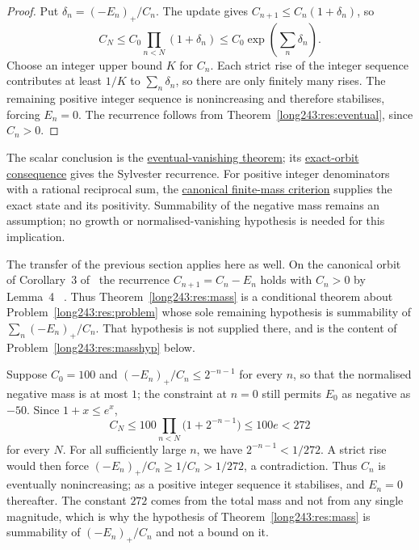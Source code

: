 \begin{proof}
Put \(\delta_n=(-E_n)_+/C_n\). The update gives
\(C_{n+1}\le C_n(1+\delta_n)\), so
\[
 C_N\le C_0\prod_{n<N}(1+\delta_n)
 \le C_0\exp\!\left(\sum_n\delta_n\right).
\]
Choose an integer upper bound \(K\) for \(C_n\). Each strict rise of the
integer sequence contributes at least \(1/K\) to \(\sum_n\delta_n\), so
there are only finitely many rises. The remaining positive integer sequence
is nonincreasing and therefore stabilises, forcing \(E_n=0\). The recurrence
follows from Theorem~\ref{long243:res:eventual}, since \(C_n>0\).
\end{proof}

\noindent The scalar conclusion is the
\href{https://github.com/wcook04/plectis-erdos/blob/d058b9150218ae23d2cfd975580088d6167e9da8/ErdosProblems/Erdos243/SparseResetRecovery.lean#L612}{eventual-vanishing theorem};
its \href{https://github.com/wcook04/plectis-erdos/blob/d058b9150218ae23d2cfd975580088d6167e9da8/ErdosProblems/Erdos243/SparseResetRecovery.lean#L690}{exact-orbit consequence}
gives the Sylvester recurrence. For positive integer denominators with a
rational reciprocal sum, the
\href{https://github.com/wcook04/plectis-erdos/blob/d058b9150218ae23d2cfd975580088d6167e9da8/ErdosProblems/Erdos243/PaperCompleteR8/CanonicalNegativeMass.lean#L19}{canonical finite-mass criterion}
supplies the exact state and its positivity. Summability of the negative mass
remains an assumption; no growth or normalised-vanishing hypothesis is needed
for this implication.

The transfer of the previous section applies here as well.  On the canonical
orbit of Corollary~3 of~\cite[p.~9]{koizumi2025} the recurrence
$C_{n+1}=C_n-E_n$ holds with $C_n>0$ by Lemma~4
~\cite[pp.~11--12]{koizumi2025}. Thus Theorem~\ref{long243:res:mass} is a conditional theorem about
Problem~\ref{long243:res:problem} whose sole remaining hypothesis is summability of
$\sum_n(-E_n)_+/C_n$.  That hypothesis is not supplied there, and is the
content of Problem~\ref{long243:res:masshyp} below.

\begin{example}\label{long243:ex:mass}
Suppose $C_0=100$ and $(-E_n)_+/C_n\le2^{-n-1}$ for every $n$, so that the
normalised negative mass is at most $1$; the constraint at $n=0$ still permits
$E_0$ as negative as $-50$.  Since $1+x\le e^{x}$,
\[
 C_N\le100\prod_{n<N}\bigl(1+2^{-n-1}\bigr)\le100e<272
\]
for every $N$. For all sufficiently large $n$, we have
$2^{-n-1}<1/272$. A strict rise would then force
$(-E_n)_+/C_n\ge1/C_n>1/272$, a contradiction. Thus $C_n$ is eventually
nonincreasing; as a positive integer sequence it stabilises, and $E_n=0$
thereafter. The constant $272$ comes from the total mass and not from any single magnitude,
which is why the hypothesis of Theorem~\ref{long243:res:mass} is summability of
$(-E_n)_+/C_n$ and not a bound on it.
\end{example}

